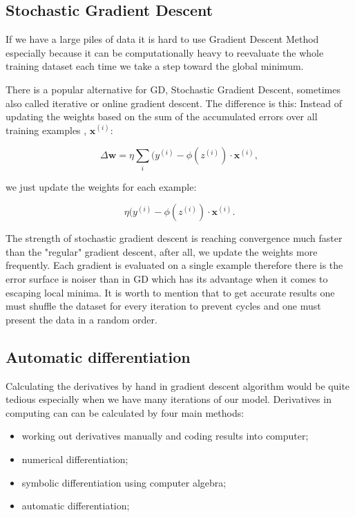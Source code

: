 \documentclass[a4paper,oneside,openright,11pt]{book}
\begin{document}
\subsection{Stochastic Gradient Descent}

If we have a large piles of data it is hard to use Gradient Descent Method especially because it can be computationally heavy to reevaluate the whole training dataset each time we take a step toward the global minimum.

There is a popular alternative for GD, Stochastic Gradient Descent, sometimes also called iterative or online gradient descent. The difference is this: Instead of updating the weights based on the sum of the accumulated errors over all training examples , $\textbf{x}^{(i)}$:

\begin{equation}
    \Delta \textbf{w} = \eta \sum_{i}^{}(y^{(i)} - \phi(z^{(i)}) \cdot \textbf{x}^{(i)},
\end{equation}


we just update the weights for each example:

\begin{equation}
    \eta (y^{(i)} - \phi(z^{(i)}) \cdot \textbf{x}^{(i)}.
\end{equation}

The strength of stochastic gradient descent is reaching convergence much faster than the "regular" gradient descent, after all, we update the weights more frequently. Each gradient is evaluated on a single example therefore there is the error surface is noiser than in GD which has its advantage when it comes to escaping local minima. It is worth to mention that to get accurate results one must shuffle the dataset for every iteration to prevent cycles and one must present the data in a random order. \cite{raschka}


\subsection{Automatic differentiation}


Calculating the derivatives by hand in gradient descent algorithm would be quite tedious especially when we have many iterations of our model. Derivatives in computing can can be calculated by four main methods:

\begin{itemize}
    \item working out derivatives manually and coding results into computer;
    \item  numerical differentiation;
    \item symbolic differentiation using computer algebra;
    \item automatic differentiation;
\end{itemize}
\end{document}
